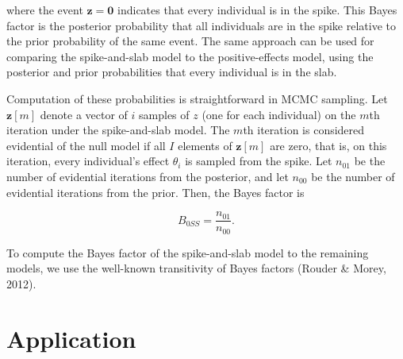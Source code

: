 \documentclass[english,man]{apa6}
\theoremstyle{definition}
\theoremstyle{definition}
\theoremstyle{remark}
\begin{document}
where the event \(\bm{z} = \bm{0}\) indicates that every individual is
in the spike. This Bayes factor is the posterior probability that all
individuals are in the spike relative to the prior probability of the
same event. The same approach can be used for comparing the
spike-and-slab model to the positive-effects model, using the posterior
and prior probabilities that every individual is in the slab.

Computation of these probabilities is straightforward in MCMC sampling.
Let \(\bm{z}[m]\) denote a vector of \(i\) samples of \(z\) (one for
each individual) on the \(m\)th iteration under the spike-and-slab
model. The \(m\)th iteration is considered evidential of the null model
if all \(I\) elements of \(\bm{z}[m]\) are zero, that is, on this
iteration, every individual's effect \(\theta_i\) is sampled from the
spike. Let \(n_{01}\) be the number of evidential iterations from the
posterior, and let \(n_{00}\) be the number of evidential iterations
from the prior. Then, the Bayes factor is

\[
B_{0 SS} = \frac{n_{01}}{n_{00}}.
\]

To compute the Bayes factor of the spike-and-slab model to the remaining
models, we use the well-known transitivity of Bayes factors (Rouder \&
Morey, 2012).

\section{Application}\label{application}
\end{document}
